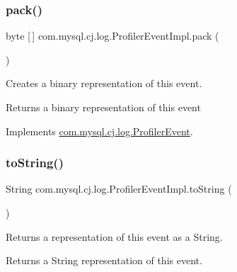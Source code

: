 \subsubsection{\texorpdfstring{pack()}{pack()}}
{\footnotesize\ttfamily byte \mbox{[}$\,$\mbox{]} com.\+mysql.\+cj.\+log.\+Profiler\+Event\+Impl.\+pack (\begin{DoxyParamCaption}{ }\end{DoxyParamCaption})}

Creates a binary representation of this event.

\begin{DoxyReturn}{Returns}
a binary representation of this event 
\end{DoxyReturn}


Implements \mbox{\hyperlink{interfacecom_1_1mysql_1_1cj_1_1log_1_1_profiler_event_ad360df515f55034065a78397e2db5269}{com.\+mysql.\+cj.\+log.\+Profiler\+Event}}.

\mbox{\label{classcom_1_1mysql_1_1cj_1_1log_1_1_profiler_event_impl_af15f923f719f69a63c271705386924b1}} 
\subsubsection{\texorpdfstring{to\+String()}{toString()}}
{\footnotesize\ttfamily String com.\+mysql.\+cj.\+log.\+Profiler\+Event\+Impl.\+to\+String (\begin{DoxyParamCaption}{ }\end{DoxyParamCaption})}

Returns a representation of this event as a String.

\begin{DoxyReturn}{Returns}
a String representation of this event. 
\end{DoxyReturn}
\mbox{\label{classcom_1_1mysql_1_1cj_1_1log_1_1_profiler_event_impl_aba1059ef66f8246a1e69d24af53dc9f0}} 

